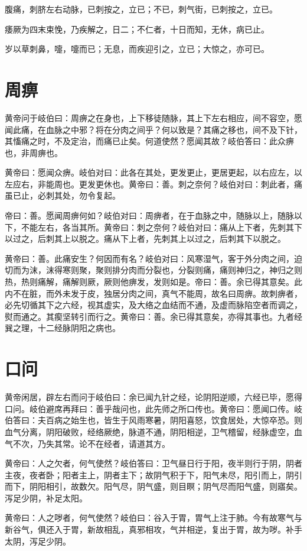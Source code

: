 \documentclass[12pt,UTF8]{ctexbook}
\begin{document}
	腹痛，刺脐左右动脉，已刺按之，立已；不已，刺气街，已刺按之，立已。
	
	痿厥为四末束悗，乃疾解之，日二；不仁者，十日而知，无休，病已止。
	
	岁以草刺鼻，嚏，嚏而已；无息，而疾迎引之，立已；大惊之，亦可已。
	\chapter{周痹}
	
	黄帝问于岐伯曰：周痹之在身也，上下移徒随脉，其上下左右相应，间不容空，愿闻此痛，在血脉之中邪？将在分肉之间乎？何以致是？其痛之移也，间不及下针，其慉痛之时，不及定治，而痛已止矣。何道使然？愿闻其故？岐伯答曰：此众痹也，非周痹也。
	
	黄帝曰：愿闻众痹。岐伯对曰：此各在其处，更发更止，更居更起，以右应左，以左应右，非能周也。更发更休也。黄帝曰：善。刺之奈何？岐伯对曰：刺此者，痛虽已止，必刺其处，勿令复起。
	
	帝曰：善。愿闻周痹何如？岐伯对曰：周痹者，在于血脉之中，随脉以上，随脉以下，不能左右，各当其所。黄帝曰：刺之奈何？岐伯对曰：痛从上下者，先刺其下以过之，后刺其上以脱之。痛从下上者，先刺其上以过之，后刺其下以脱之。
	
	黄帝曰：善。此痛安生？何因而有名？岐伯对曰：风寒湿气，客于外分肉之间，迫切而为沫，沫得寒则聚，聚则排分肉而分裂也，分裂则痛，痛则神归之，神归之则热，热则痛解，痛解则厥，厥则他痹发，发则如是。帝曰：善。余已得其意矣。此内不在脏，而外未发于皮，独居分肉之间，真气不能周，故名曰周痹。故刺痹者，必先切循其下之六经，视其虚实，及大络之血结而不通，及虚而脉陷空者而调之，熨而通之。其瘈坚转引而行之。黄帝曰：善。余已得其意矣，亦得其事也。九者经巽之理，十二经脉阴阳之病也。
	\chapter{口问}
	
	黄帝闲居，辟左右而问于岐伯曰：余已闻九针之经，论阴阳逆顺，六经已毕，愿得口问。岐伯避席再拜曰：善乎哉问也，此先师之所口传也。黄帝曰：愿闻口传。岐伯答曰：夫百病之始生也，皆生于风雨寒暑，阴阳喜怒，饮食居处，大惊卒恐。则血气分离，阴阳破败，经络厥绝，脉道不通，阴阳相逆，卫气稽留，经脉虚空，血气不次，乃失其常。论不在经者，请道其方。
	
	黄帝曰：人之欠者，何气使然？岐伯答曰：卫气昼日行于阳，夜半则行于阴，阴者主夜，夜者卧；阳者主上，阴者主下；故阴气积于下，阳气未尽，阳引而上，阴引而下，阴阳相引，故数欠。阳气尽，阴气盛，则目瞑；阴气尽而阳气盛，则寤矣。泻足少阴，补足太阳。
	
	黄帝曰：人之哕者，何气使然？岐伯曰：谷入于胃，胃气上注于肺。今有故寒气与新谷气，俱还入于胃，新故相乱，真邪相攻，气并相逆，复出于胃，故为哕。补手太阴，泻足少阴。
	
\end{document}
